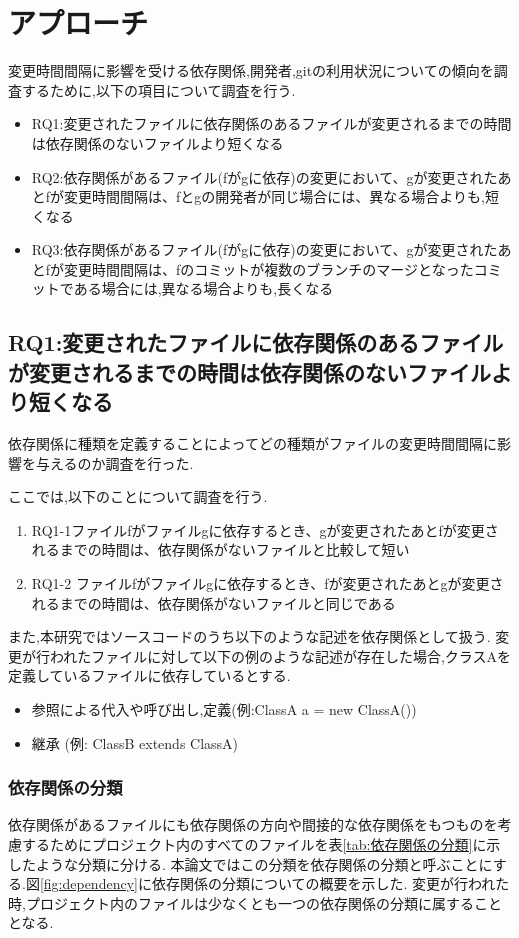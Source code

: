 \documentclass{fose2016}           %
\begin{document}
\section{アプローチ}\label{アプローチ}
変更時間間隔に影響を受ける依存関係,開発者,gitの利用状況についての傾向を調査するために,以下の項目について調査を行う.
\begin{itemize}
\item RQ1:変更されたファイルに依存関係のあるファイルが変更されるまでの時間は依存関係のないファイルより短くなる
\item RQ2:依存関係があるファイル(fがgに依存)の変更において、gが変更されたあとfが変更時間間隔は、fとgの開発者が同じ場合には、異なる場合よりも,短くなる
\item RQ3:依存関係があるファイル(fがgに依存)の変更において、gが変更されたあとfが変更時間間隔は、fのコミットが複数のブランチのマージとなったコミットである場合には,異なる場合よりも,長くなる
\end{itemize}
\subsection{RQ1:変更されたファイルに依存関係のあるファイルが変更されるまでの時間は依存関係のないファイルより短くなる}
依存関係に種類を定義することによってどの種類がファイルの変更時間間隔に影響を与えるのか調査を行った.

ここでは,以下のことについて調査を行う.
\begin{enumerate}
\item RQ1-1ファイルfがファイルgに依存するとき、gが変更されたあとfが変更されるまでの時間は、依存関係がないファイルと比較して短い
\item RQ1-2 ファイルfがファイルgに依存するとき、fが変更されたあとgが変更されるまでの時間は、依存関係がないファイルと同じである
\end{enumerate}

また,本研究ではソースコードのうち以下のような記述を依存関係として扱う.
変更が行われたファイルに対して以下の例のような記述が存在した場合,クラスAを定義しているファイルに依存しているとする.

\begin{itemize}
\item 参照による代入や呼び出し,定義(例:ClassA a = new ClassA())
\item 継承 (例: ClassB extends ClassA)
\end{itemize}

\subsubsection{依存関係の分類}
依存関係があるファイルにも依存関係の方向や間接的な依存関係をもつものを考慮するためにプロジェクト内のすべてのファイルを表\ref{tab:依存関係の分類}に示したような分類に分ける.
本論文ではこの分類を依存関係の分類と呼ぶことにする.図\ref{fig:dependency}に依存関係の分類についての概要を示した.
変更が行われた時,プロジェクト内のファイルは少なくとも一つの依存関係の分類に属することとなる.
\end{document}
